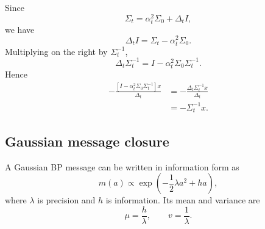\documentclass[11pt]{article}
\begin{document}
Since
\begin{equation}
  \Sigma_t=\alpha_t^2\Sigma_0+\Delta_t I,
\end{equation}
we have
\begin{equation}
  \Delta_t I=\Sigma_t-\alpha_t^2\Sigma_0.
\end{equation}
Multiplying on the right by \(\Sigma_t^{-1}\),
\begin{equation}
  \Delta_t\Sigma_t^{-1}=I-\alpha_t^2\Sigma_0\Sigma_t^{-1}.
\end{equation}
Hence
\begin{align}
  -\frac{[I-\alpha_t^2\Sigma_0\Sigma_t^{-1}]x}{\Delta_t}
  &= -\frac{\Delta_t\Sigma_t^{-1}x}{\Delta_t}\\
  &= -\Sigma_t^{-1}x.
\end{align}

\subsection{Gaussian message closure}

A Gaussian BP message can be written in information form as
\begin{equation}
  m(a)\propto \exp\left(-\frac12\lambda a^2+ha\right),
  \label{eq:gaussian-message}
\end{equation}
where \(\lambda\) is precision and \(h\) is information. Its mean and variance are
\begin{equation}
  \mu=\frac{h}{\lambda},
  \qquad
  v=\frac{1}{\lambda}.
\end{equation}
\end{document}
